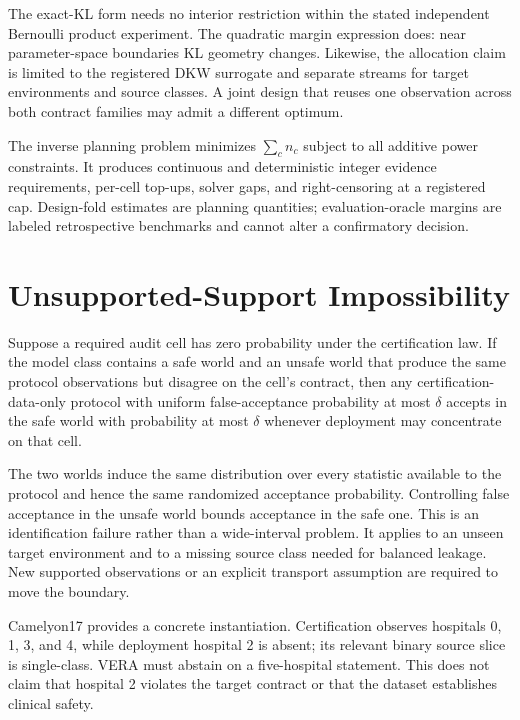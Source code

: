The exact-KL form needs no interior restriction within the stated independent
Bernoulli product experiment. The quadratic margin expression does: near
parameter-space boundaries KL geometry changes. Likewise, the allocation
claim is limited to the registered DKW surrogate and separate streams for target
environments and source classes. A joint design that reuses one observation
across both contract families may admit a different optimum.

The inverse planning problem minimizes $\sum_cn_c$ subject to all additive
power constraints. It produces continuous and deterministic integer evidence
requirements, per-cell top-ups, solver gaps, and right-censoring at a registered
cap. Design-fold estimates are planning quantities; evaluation-oracle margins
are labeled retrospective benchmarks and cannot alter a confirmatory decision.

\section{Unsupported-Support Impossibility}
\label{neurips:sec:impossibility}

\begin{theorem}
\label{neurips:thm:impossibility}
Suppose a required audit cell has zero probability under the certification law.
If the model class contains a safe world and an unsafe world that produce the
same protocol observations but disagree on the cell's contract, then any
certification-data-only protocol with uniform false-acceptance probability at most
$\delta$ accepts in the safe world with probability at most $\delta$ whenever
deployment may concentrate on that cell.
\end{theorem}

The two worlds induce the same distribution over every statistic available to
the protocol and hence the same randomized acceptance probability. Controlling
false acceptance in the unsafe world bounds acceptance in the safe one. This is
an identification failure rather than a wide-interval problem. It applies to an
unseen target environment and to a missing source class needed for balanced
leakage. New supported observations or an explicit transport assumption are
required to move the boundary.

Camelyon17 provides a concrete instantiation. Certification observes hospitals
0, 1, 3, and 4, while deployment hospital 2 is absent; its relevant binary
source slice is single-class. VERA must abstain on a five-hospital statement.
This does not claim that hospital 2 violates the target contract or that the
dataset establishes clinical safety.

